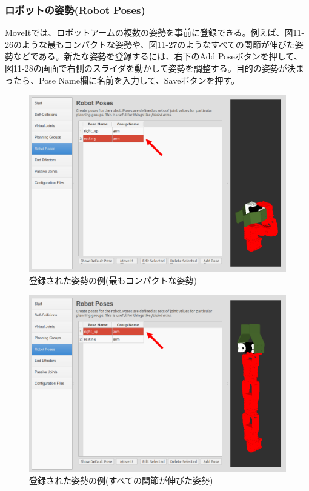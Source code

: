 \subsubsection{ロボットの姿勢(Robot Poses)}

MoveItでは、ロボットアームの複数の姿勢を事前に登録できる。例えば、図11-26のような最もコンパクトな姿勢や、図11-27のようなすべての関節が伸びた姿勢などである。新たな姿勢を登録するには、右下のAdd Poseボタンを押して、図11-28の画面で右側のスライダを動かして姿勢を調整する。目的の姿勢が決まったら、Pose Name欄に名前を入力して、Saveボタンを押す。

\begin{figure}[htp]
  \centering
  \includegraphics[width=12cm]{pictures/chapter11/pic_11_26.png}
  \caption{登録された姿勢の例(最もコンパクトな姿勢)}
\end{figure}

\begin{figure}[htp]
  \centering
  \includegraphics[width=12cm]{pictures/chapter11/pic_11_27.png}
  \caption{登録された姿勢の例(すべての関節が伸びた姿勢)}
\end{figure}

